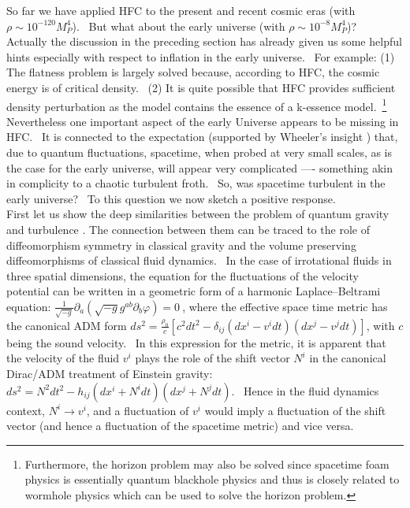 \documentclass[12pt]{article}
\begin{document}
So far we have applied HFC to the present and recent cosmic eras 
(with $\rho \sim 10^{-120} M_P^4$).  But what about the early
universe (with $\rho \sim 10^{-8} M_P^4$)?  
Actually the discussion in the preceding section has already given us
some helpful hints \cite{Arzano}
especially with respect to inflation \cite{inflat} in the early universe.  
For example: (1) The flatness problem is largely solved because,
according to HFC, the cosmic energy is of critical density.  (2) It is quite
possible that HFC provides sufficient density perturbation as the model contains
the essence of a k-essence model. \footnote{Furthermore, the horizon problem may also be 
solved
since spacetime foam physics is essentially quantum blackhole physics and thus
is closely related to wormhole physics which can be used \cite{HK}
to solve the horizon problem.}  Nevertheless one important aspect of the early Universe  
appears to be missing in HFC.  It is connected to the expectation (supported by
Wheeler's insight \cite{wh55}) that, due to quantum fluctuations, spacetime, when probed at
very small scales, as is the case for the early universe, will appear very
complicated —- something akin in complicity to a chaotic turbulent froth.  So,
was spacetime turbulent in the early universe?  To this question we now sketch a
positive response.\\

First let us show the
deep similarities between the problem of quantum gravity and
turbulence \cite{jej08}.
The connection between them can be traced to the role of diffeomorphism
symmetry in classical gravity and the volume preserving diffeomorphisms
of classical fluid dynamics.  In the case of irrotational fluids in
three spatial dimensions,
the equation for the fluctuations of the velocity potential can be written in a
geometric
form \cite{unr95} of a harmonic Laplace--Beltrami equation:
$\frac{1}{\sqrt{-g}} \partial_a( \sqrt{-g} g^{ab} \partial_b \varphi) = 0 ~$,
where the effective space time metric has the canonical ADM form
$ds^2 = \frac{\rho_0}{c} [ c^2 dt^2 - \delta_{ij}(dx^i - v^i dt)(dx^j - v^j
dt)]$, with $c$ being the sound velocity. 
In this expression for the metric, it is apparent that the velocity of the fluid
$v^i$ plays the role of the shift vector
$N^i$ in the canonical Dirac/ADM treatment of Einstein gravity:
$ds^2 = N^2 dt^2 - h_{ij} (dx^i + N^i dt) (dx^j + N^j dt)$. 
Hence in the fluid dynamics context, $N^i \rightarrow v^i$, and a fluctuation of
$v^i$ would imply a fluctuation of the shift vector (and hence 
a fluctuation of the spacetime metric) and vice versa.\\ 
\end{document}
